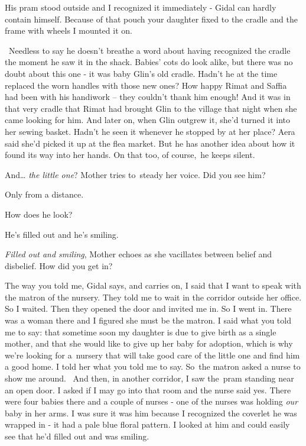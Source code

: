 \documentclass[letterpaper]{article}
\begin{document}
{\textquotedbl}His pram stood outside and I recognized it immediately -{\textquotedbl} Gidal can hardly contain himself.
{\textquotedbl}Because of that pouch your daughter fixed to the cradle and the frame with wheels I mounted it
on.{\textquotedbl} 

~Needless to say he doesn't breathe a word about having recognized the cradle the moment he saw it in the shack. Babies'
cots do look alike, but there was no doubt about this one - it was baby Glin's old cradle. Hadn't he at the time
replaced the worn handles with those new ones? How happy Rimat and Saffia had been with his handiwork -- they couldn't
thank him enough!{ }And it was in that very cradle that Rimat had
brought{ }Glin to the village that night when she came looking for him. And
later on, when Glin outgrew it, she'd turned it into her sewing basket. Hadn't he seen it whenever he stopped
by{ }at{ }her place? Aera said she'd picked it up at the flea market. But he has another
idea about how it found its way into her hands. On that too, of course,~he keeps silent. ~~

{\textquotedbl}And{\dots} \textit{the little one}?{\textquotedbl} Mother tries to~steady her voice.{\textquotedbl} Did
you see him?{\textquotedbl} 

{\textquotedbl}Only from a distance.{\textquotedbl} 

{\textquotedbl}How does he look?{\textquotedbl} 

{\textquotedbl}He's filled out and he's smiling.{\textquotedbl} 

{\textquotedbl}\textit{Filled out and smiling},{\textquotedbl} Mother echoes as she vacillates between belief and
disbelief. {\textquotedbl}How did you get in?{\textquotedbl} 

{\textquotedbl}The way you told me,{\textquotedbl} Gidal says, and carries on, {\textquotedbl}I said that I want to
speak with the matron of the nursery. They told me to wait in the corridor outside her office. So I waited. Then they
opened the door and invited me in. So I went in. There was a woman there and I figured she must be the matron. I said
what you told me to say: that sometime soon my daughter is due to give birth as a single mother, and that she would
like to give up her baby for adoption, which is why we're looking for a~nursery that will take good care of the little
one and find him a good home. I told her what you told me to say. So~the matron asked a nurse to show me around.~ And
then, in another corridor, I saw the~pram standing near an open door. I asked if I may go into that room and the nurse
said yes. There were four babies there and a couple of nurses - one of the nurses was holding\textit{ our }baby in her
arms. I was sure it was him because I recognized the coverlet he was wrapped in - it had a pale blue floral pattern. I
looked at him and could easily see that he'd filled out and was smiling. {\textquotedbl} 
\end{document}
